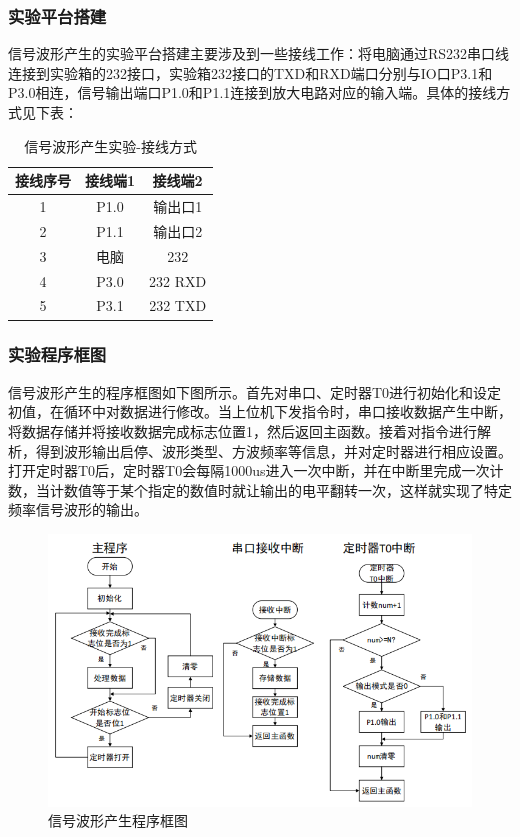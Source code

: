 \documentclass[UTF8]{article}
\begin{document}
\subsubsection{实验平台搭建}
信号波形产生的实验平台搭建主要涉及到一些接线工作：将电脑通过RS232串口线连接到实验箱的232接口，实验箱232接口的TXD和RXD端口分别与IO口P3.1和P3.0相连，信号输出端口P1.0和P1.1连接到放大电路对应的输入端。具体的接线方式见下表：
\begin{table}[H] %
\centering %
\begin{tabular}{ccc} %
	\toprule %
	接线序号 & 接线端1 & 接线端2 \\
	\midrule %
	1 & P1.0 & 输出口1 \\
	2 & P1.1 & 输出口2 \\
	3 & 电脑 & 232 \\
	4 & P3.0 & 232 RXD \\
	5 & P3.1 & 232 TXD \\
	\bottomrule %
\end{tabular}
\caption{信号波形产生实验-接线方式} %
\end{table}

\subsubsection{实验程序框图}
信号波形产生的程序框图如下图所示。首先对串口、定时器T0进行初始化和设定初值，在循环中对数据进行修改。当上位机下发指令时，串口接收数据产生中断，将数据存储并将接收数据完成标志位置1，然后返回主函数。接着对指令进行解析，得到波形输出启停、波形类型、方波频率等信息，并对定时器进行相应设置。打开定时器T0后，定时器T0会每隔1000us进入一次中断，并在中断里完成一次计数，当计数值等于某个指定的数值时就让输出的电平翻转一次，这样就实现了特定频率信号波形的输出。
\begin{figure}[H]
    \centering %
    \includegraphics[width=.8\textwidth]{figure/信号波形产生-程序框图.png} 
    \caption{信号波形产生程序框图} %
\end{figure}
\end{document}
